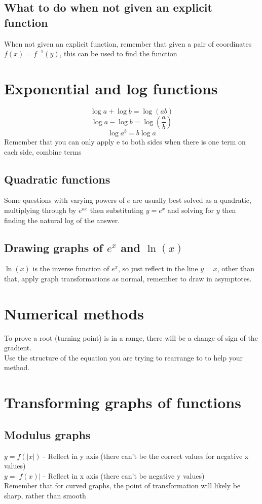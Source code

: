\documentclass{article}[18pt]
\begin{document}
\subsection{What to do when not given an explicit function}
When not given an explicit function, remember that given a pair of coordinates $f(x)=f^{-1}(y)$, this can be used to find the function
\section{Exponential and log functions}
$$\log a+\log b=\log(ab)$$
$$\log a-\log b=\log(\frac{a}{b})$$
$$\log a^b=b\log a$$
Remember that you can only apply e to both sides when there is one term on each side, combine terms
\subsection{Quadratic functions}
Some questions with varying powers of $e$ are usually best solved as a quadratic, multiplying through by $e^{ax}$ then substituting $y=e^x$ and solving for $y$ then finding the natural log of the answer.
\subsection{Drawing graphs of $e^x$ and $\ln(x)$}
$\ln(x)$ is the inverse function of $e^x$, so just reflect in the line $y=x$, other than that, apply graph transformations as normal, remember to draw in asymptotes.
\section{Numerical methods}
To prove a root (turning point) is in a range, there will be a change of sign of the gradient.\\
Use the structure of the equation you are trying to rearrange to to help your method.
\section{Transforming graphs of functions}
\subsection{Modulus graphs}
$y=f(|x|)$ - Reflect in y axis (there can't be the correct values for negative x values)\\
$y=|f(x)|$ - Reflect in x axis (there can't be negative y values)\\
Remember that for curved graphs, the point of transformation will likely be sharp, rather than smooth
\end{document}
